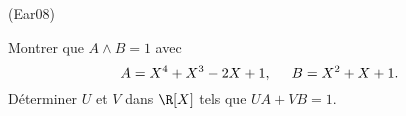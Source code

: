 \begin{tiny}(Ear08)\end{tiny} Montrer que $A \wedge B = 1$ avec
\[
A=X^{4}+X^{3}-2X+1, \hspace{0.5cm} B=X^{2}+X+1. 
\]
Déterminer $U$ et $V$ dans $\R[X]$ tels que $UA+VB=1$.